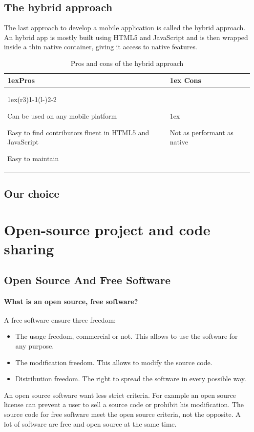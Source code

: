\documentclass[11pt, a4paper]{report}
\begin{document}
\subsection{The hybrid approach}

The last approach to develop a mobile application is called the hybrid approach. An hybrid app is mostly built using HTML5 and JavaScript and is then wrapped inside a thin native container, giving it access to native features.

\begin{table}[H]
\begin{tabularx}{\linewidth}{>{\parskip1ex}X@{\kern4\tabcolsep}>{\parskip1ex}X}
\toprule
\hfil\bfseries Pros
&
\hfil\bfseries Cons
\\\cmidrule(r{3\tabcolsep}){1-1}\cmidrule(l{-\tabcolsep}){2-2}

Can be used on any mobile platform\par
Easy to find contributors fluent in HTML5 and JavaScript\par
Easy to maintain\par

&

Not as performant as native\par



\\\bottomrule
\end{tabularx}
\caption{Pros and cons of the hybrid approach}
\end{table}

\subsection{Our choice}

\section{Open-source project and code sharing}


\subsection{Open Source And Free Software}
\paragraph{What is an open source, free software?\\}
A free software ensure three freedom:
\begin{itemize}
\item The usage freedom, commercial or not. This allows to use the software for any purpose.
\item The modification freedom. This allows to modify the source code.
\item Distribution freedom. The right to spread the software in every possible way.   	 
\end{itemize} 
An open source software want less strict criteria. For example an open source license can prevent a user to sell a source code or prohibit his modification. The source code for free software meet the open source criteria, not the opposite. A lot of software are free and open source at the same time.
\end{document}
